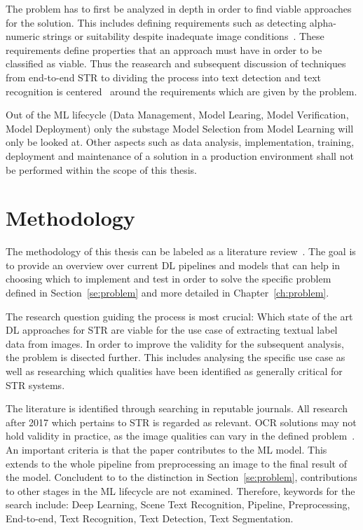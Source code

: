 The problem has to first be analyzed in depth in order to find viable approaches for the solution.
This includes defining requirements such as detecting alpha-numeric strings or suitability despite
inadequate image conditions~\citep{ghosh_visual_2017, hu_gtc_2020}.
These requirements define properties that an approach must have in order to be classified as viable.
Thus the reasearch and subsequent discussion of techniques from end-to-end \ac{STR} to dividing the
process into text detection and text recognition is centered~\cite{chen_text_2021} around the
requirements which are given by the problem.

Out of the \ac{ML} lifecycle (Data Management, Model Learing, Model Verification, Model Deployment)
only the substage Model Selection from Model Learning will only be looked at.
Other aspects such as data analysis, implementation, training, deployment and maintenance of a
solution in a production environment shall not be performed within the scope of this thesis.

\section{Methodology}\label{se:methodology}
The methodology of this thesis can be labeled as a literature review~\citep{snyder_literature_2019,
torraco_writing_2005}.
The goal is to provide an overview over current \ac{DL} pipelines and models that can help in
choosing which to implement and test in order to solve the specific problem defined in
Section~\ref{se:problem} and more detailed in Chapter~\ref{ch:problem}.

The research question guiding the process is most crucial: Which state of the art \ac{DL}
approaches for \ac{STR} are viable for the use case of extracting textual label data from
images.
In order to improve the validity for the subsequent analysis, the problem is disected further.
This includes analysing the specific use case as well as researching which qualities have been
identified as generally critical for \ac{STR} systems.


The literature is identified through searching in reputable journals.
All research after 2017 which pertains to \ac{STR} is regarded as relevant.
\ac{OCR} solutions may not hold validity in practice, as the image qualities can vary in the
defined problem~\citep{chen_text_2021}.
An important criteria is that the paper contributes to the \ac{ML} model.
This extends to the whole pipeline  from preprocessing an image to the final result of the model.
Concludent to to the distinction in Section~\ref{se:problem}, contributions to other stages in the
\ac{ML} lifecycle are not examined.
Therefore, keywords for the search include: Deep Learning, Scene Text Recognition, Pipeline,
Preprocessing, End-to-end, Text Recognition, Text Detection, Text Segmentation.


